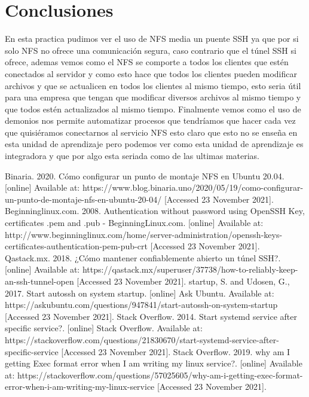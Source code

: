 \documentclass[11pt]{article}
\begin{document}
		\section{Conclusiones}
	En esta practica pudimos ver el uso de NFS media un puente SSH ya que por si solo NFS no ofrece una comunicación segura, caso contrario que el túnel SSH si ofrece, ademas vemos como el NFS se comporte a todos los clientes que estén conectados al servidor y como esto hace que todos los clientes pueden modificar archivos y que se actualicen en todos los clientes al mismo tiempo, esto seria útil para una empresa que tengan que modificar diversos archivos al mismo tiempo y que todos estén actualizados al mismo tiempo. Finalmente vemos como el uso de demonios nos permite automatizar procesos que tendríamos que hacer cada vez que quisiéramos conectarnos al servicio NFS esto claro que esto no se enseña en esta unidad de aprendizaje pero podemos ver como esta unidad de aprendizaje es integradora y que por algo esta seriada como de las ultimas materias.
		\begin{thebibliography}{1}
  Binaria. 2020. Cómo configurar un punto de montaje NFS en Ubuntu 20.04. [online] Available at: https://www.blog.binaria.uno/2020/05/19/como-configurar-un-punto-de-montaje-nfs-en-ubuntu-20-04/ [Accessed 23 November 2021].
  Beginninglinux.com. 2008. Authentication without password using OpenSSH Key, certificates .pem and .pub - BeginningLinux.com. [online] Available at: http://www.beginninglinux.com/home/server-administration/openssh-keys-certificates-authentication-pem-pub-crt [Accessed 23 November 2021].
    Qastack.mx. 2018. ¿Cómo mantener confiablemente abierto un túnel SSH?. [online] Available at: https://qastack.mx/superuser/37738/how-to-reliably-keep-an-ssh-tunnel-open [Accessed 23 November 2021].
    startup, S. and Udosen, G., 2017. Start autossh on system startup. [online] Ask Ubuntu. Available at: https://askubuntu.com/questions/947841/start-autossh-on-system-startup [Accessed 23 November 2021].
    Stack Overflow. 2014. Start systemd service after specific service?. [online] Stack Overflow. Available at: https://stackoverflow.com/questions/21830670/start-systemd-service-after-specific-service [Accessed 23 November 2021].
     Stack Overflow. 2019. why am I getting Exec format error when I am writing my linux service?. [online] Available at: https://stackoverflow.com/questions/57025605/why-am-i-getting-exec-format-error-when-i-am-writing-my-linux-service [Accessed 23 November 2021].
\end{thebibliography}
\end{document}
